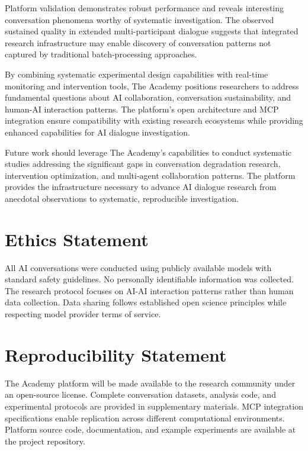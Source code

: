 \documentclass[11pt,letterpaper]{article}
\newcommand{\theacademy}{The Academy}
\newcommand{\mcp}{MCP}
\begin{document}
Platform validation demonstrates robust performance and reveals interesting conversation phenomena worthy of systematic investigation. The observed sustained quality in extended multi-participant dialogue suggests that integrated research infrastructure may enable discovery of conversation patterns not captured by traditional batch-processing approaches.

By combining systematic experimental design capabilities with real-time monitoring and intervention tools, \theacademy{} positions researchers to address fundamental questions about AI collaboration, conversation sustainability, and human-AI interaction patterns. The platform's open architecture and \mcp{} integration ensure compatibility with existing research ecosystems while providing enhanced capabilities for AI dialogue investigation.

Future work should leverage \theacademy{}'s capabilities to conduct systematic studies addressing the significant gaps in conversation degradation research, intervention optimization, and multi-agent collaboration patterns. The platform provides the infrastructure necessary to advance AI dialogue research from anecdotal observations to systematic, reproducible investigation.

\section*{Ethics Statement}

All AI conversations were conducted using publicly available models with standard safety guidelines. No personally identifiable information was collected. The research protocol focuses on AI-AI interaction patterns rather than human data collection. Data sharing follows established open science principles while respecting model provider terms of service.

\section*{Reproducibility Statement}

\theacademy{} platform will be made available to the research community under an open-source license. Complete conversation datasets, analysis code, and experimental protocols are provided in supplementary materials. \mcp{} integration specifications enable replication across different computational environments. Platform source code, documentation, and example experiments are available at the project repository.
\end{document}
